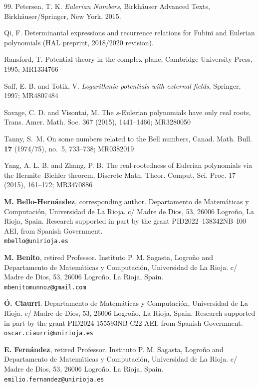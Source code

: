 \documentclass[11pt]{article}
\begin{document}
\begin{thebibliography}{99.}
Petersen, T. K.
{\it Eulerian Numbers},
Birkh\"auser Advanced Texts, Birkh\"auser/Springer, New York, 2015.

 Qi, F. Determinantal expressions and recurrence relations for Fubini and Eulerian polynomials (HAL preprint, 2018/2020 revision).

 Ransford, T. Potential theory in the complex plane, Cambridge University Press,  1995; MR1334766

 Saff, E. B. and Totik, V.
\textit{Logarithmic potentials with external fields}, Springer, 1997; MR4807484

 Savage, C. D.  and Visontai, M.  The $s$-Eulerian polynomials have only real roots, Trans. Amer. Math. Soc. 367 (2015), 1441–1466; MR3280050


 Tanny, S.~M. On some numbers related to the Bell numbers, Canad. Math. Bull. {\bf 17} (1974/75), no.~5, 733--738; MR0382019

 Yang, A. L. B. and Zhang, P. B.  The real-rootedness of Eulerian polynomials via the Hermite–Biehler theorem, Discrete Math. Theor. Comput. Sci. Proc. 17 (2015), 161–172;
MR3470886
\end{thebibliography}

\newpage


\noindent
\textbf{M. Bello-Hernández}, corresponding author. Departamento de Matemáticas y Computación, Universidad de La Rioja. c/ Madre de Dios, 53, 26006 Logroño, La Rioja, Spain. Research supported in part by the grant PID2022--138342NB--I00 AEI, from Spanish Government. \\\texttt{mbello@unirioja.es}


\vspace{0.3cm}

\noindent
\textbf{M. Benito}, retired Professor. Instituto P. M. Sagasta, Logro{\~n}o and Departamento de Matemáticas y Computación, Universidad de La Rioja. c/ Madre de Dios, 53, 26006 Logroño, La Rioja, Spain. \\ \texttt{mbenitomunnoz@gmail.com}


\vspace{0.3cm}

\noindent
\textbf{Ó. Ciaurri}. Departamento de Matemáticas y Computación, Universidad de La Rioja. c/ Madre de Dios, 53, 26006 Logroño, La Rioja, Spain. Research supported in part by the grant PID2024-155593NB-C22 AEI, from Spanish Government. \\ \texttt{oscar.ciaurri@unirioja.es}

\vspace{0.3cm}

\noindent
\textbf{E. Fernández}, retired Professor. Instituto P. M. Sagasta, Logro{\~n}o and Departamento de Matemáticas y Computación, Universidad de La Rioja. c/ Madre de Dios, 53, 26006 Logroño, La Rioja, Spain. \\\texttt{emilio.fernandez@unirioja.es}
\end{document}
